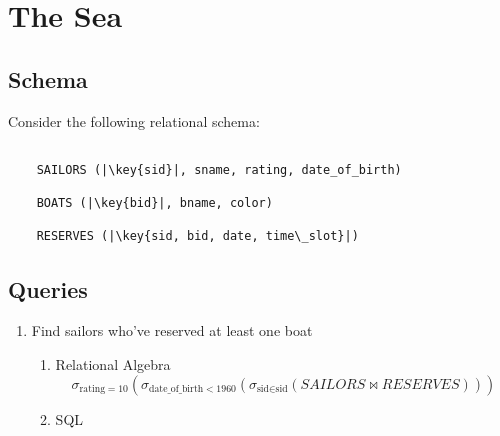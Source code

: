 \section{The Sea}

\subsection{Schema}

Consider the following relational schema:


\begin{verbatim}

    SAILORS (|\key{sid}|, sname, rating, date_of_birth)

    BOATS (|\key{bid}|, bname, color)

    RESERVES (|\key{sid, bid, date, time\_slot}|)

\end{verbatim}


\subsection{Queries}

\begin{enumerate}
    \item  Find sailors who've reserved at least one boat
          \begin{enumerate}
              \item Relational Algebra
                    \begin{equation*}
                        \sigma_{\text{rating} = 10}(\sigma_{\text{date\_of\_birth} < 1960}(\sigma_{\text{sid} \in \text{sid}}(SAILORS \bowtie RESERVES)))
                    \end{equation*}

              \item  SQL \linebreak {}
          \end{enumerate}
\end{enumerate}


\pagebreak